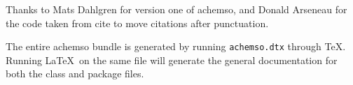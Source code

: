 \documentclass[journal=jacsat,manuscript=article]{achemso}
\begin{document}
Thanks to Mats Dahlgren for version one of \textsf{achemso},
and Donald Arseneau for the code taken from \textsf{cite} to
move citations after punctuation.

\suppinfo

The entire \textsf{achemso} bundle is generated by running
\texttt{achemso.dtx} through \TeX. Running \LaTeX\ on the same file
will generate the general documentation for both the class and
package files.


\end{document}
